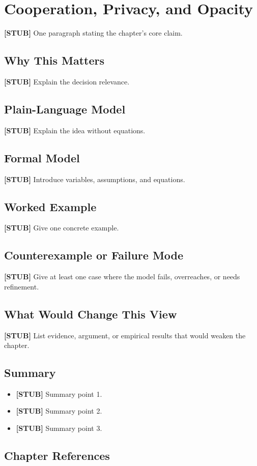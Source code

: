 \chapter{Cooperation, Privacy, and Opacity}
\label{ch:cooperation-privacy-opacity}

\begin{chapterthesis}
\textbf{[STUB]} One paragraph stating the chapter's core claim.
\end{chapterthesis}

\section{Why This Matters}

\textbf{[STUB]} Explain the decision relevance.

\section{Plain-Language Model}

\textbf{[STUB]} Explain the idea without equations.

\section{Formal Model}

\textbf{[STUB]} Introduce variables, assumptions, and equations.

\section{Worked Example}

\textbf{[STUB]} Give one concrete example.

\section{Counterexample or Failure Mode}

\textbf{[STUB]} Give at least one case where the model fails, overreaches, or needs refinement.

\section{What Would Change This View}

\textbf{[STUB]} List evidence, argument, or empirical results that would weaken the chapter.

\section{Summary}

\begin{itemize}
  \item \textbf{[STUB]} Summary point 1.
  \item \textbf{[STUB]} Summary point 2.
  \item \textbf{[STUB]} Summary point 3.
\end{itemize}

\section*{Chapter References}

